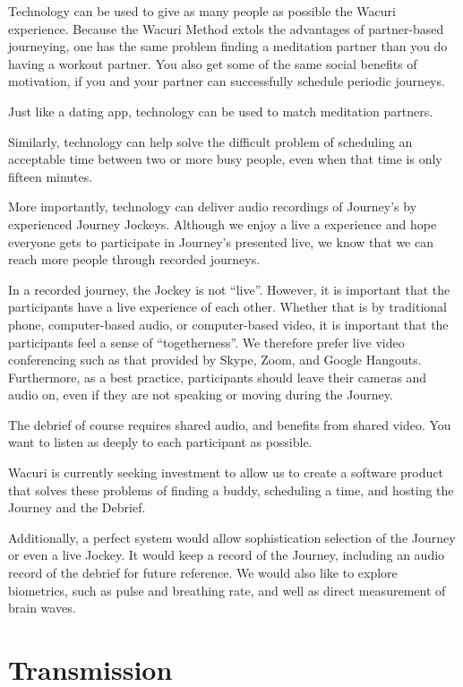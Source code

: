 \documentclass[12pt]{book}
\begin{document}
Technology can be used to give as many people as possible the Wacuri experience.
Because the Wacuri Method extols the advantages of partner-based journeying,
one has the same problem finding a meditation partner than you do having a
workout partner. You also get some of the same social benefits of motivation,
if you and your partner can successfully schedule periodic journeys.

Just like a dating app, technology can be used to match meditation partners.

Similarly, technology can help solve the difficult problem of scheduling an
acceptable time between two or more busy people, even when that time is only fifteen minutes.

More importantly, technology can deliver audio recordings of Journey's by
experienced Journey Jockeys. Although we enjoy a live a experience and hope
everyone gets to participate in Journey's presented live, we know that we
can reach more people through recorded journeys.

In a recorded journey, the Jockey is not ``live''. However, it is
important that the participants have a live experience of each other.
Whether that is by traditional phone, computer-based audio, or computer-based
video, it is important that the participants feel a sense of ``togetherness''.
We therefore prefer live video conferencing such as that provided by Skype,
Zoom, and Google Hangouts. Furthermore, as a best practice, participants
should leave their cameras and audio on, even if they are not speaking or
moving during the Journey.

The debrief of course requires shared audio, and benefits from shared video.
You want to listen as deeply to each participant as possible.

Wacuri is currently seeking investment to allow us to create a software
product that solves these problems of finding a buddy, scheduling a time,
and hosting the Journey and the Debrief.

Additionally, a perfect system would allow sophistication selection of
the Journey or even a live Jockey. It would keep a record of the Journey,
including an audio record of the debrief for future reference. We would
also like to explore biometrics, such as pulse and breathing rate, and
well as direct measurement of brain waves.


\chapter{Transmission}
\end{document}
